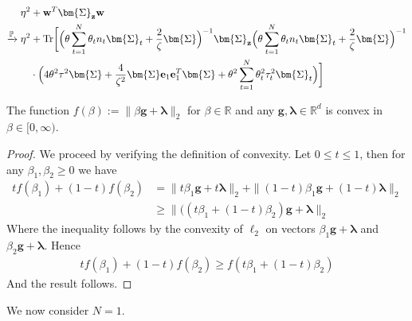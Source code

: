 \documentclass[final]{l4dc2026}
\newcommand{\bSigma}{\bm{\Sigma}}
\newcommand{\blambda}{\bm{\lambda}}
\newcommand{\bI}{\mathbf{I}}
\newcommand{\be}{\mathbf{e}}
\newcommand{\bg}{\mathbf{g}}
\newcommand{\bh}{\mathbf{h}}
\newcommand{\bw}{\mathbf{w}}
\newcommand{\bz}{\mathbf{z}}
\newcommand{\bbR}{\mathbb{R}}
\newcommand{\bbP}{\mathbb{P}}
\newcommand{\tr}{\text{Tr}}
\newcommand{\rarrowp}{\xrightarrow[]{\bbP}}
\begin{document}
\begin{align*}
    \eta^2 &+ \bw^T \bSigma_{\bz} \bw  \\
    \rarrowp \eta^2  &+ \tr \biggl[ \Bigl(  \theta \sum_{t=1}^N \theta_t n_t \bSigma_t + \frac{2}{\zeta} \bSigma \Bigr)^{-1} \bSigma_{\bz}  \Bigl(  \theta \sum_{t=1}^N \theta_t n_t \bSigma_t + \frac{2}{\zeta} \bSigma \Bigr)^{-1} \\
    &\cdot \Bigl( 4 \theta^2 \tau^2 \bSigma + \frac{4}{\zeta^2} \bSigma \be_1 \be_1^T \bSigma + \theta^2 \sum_{t=1}^N \theta^2_t \tau^2_t \bSigma_t \Bigr)\biggr]
\end{align*}
\begin{lemma}\label{lem: conv_beta}
    The function $f(\beta):= \|\beta \bg + \blambda\|_2$ for $\beta \in \bbR$ and any $\bg, \blambda \in \bbR^{d}$ is convex in $\beta \in [0, \infty)$.
\end{lemma}
\begin{proof}
    We proceed by verifying the definition of convexity. Let $0\le t\le 1$, then for any $\beta_1, \beta_2 \ge 0$ we have
    \begin{align*}
        t f(\beta_1) + (1-t) f(\beta_2) &= \|t \beta_1 \bg + t \blambda \|_2 +   \|(1-t) \beta_1 \bg + (1-t) \blambda \|_2 \\
        &\ge \|((t \beta_1 + (1-t) \beta_2) \bg + \blambda \|_2
    \end{align*}
    Where the inequality follows by the convexity of $\ell_2$ on vectors $\beta_1 \bg +  \blambda$ and $\beta_2 \bg +  \blambda$. Hence
    \begin{align*}
        t f(\beta_1) + (1-t) f(\beta_2) \ge f(t\beta_1 + (1-t) \beta_2)
    \end{align*}
    And the result follows.
\end{proof}
We now consider $N=1$.
\end{document}
